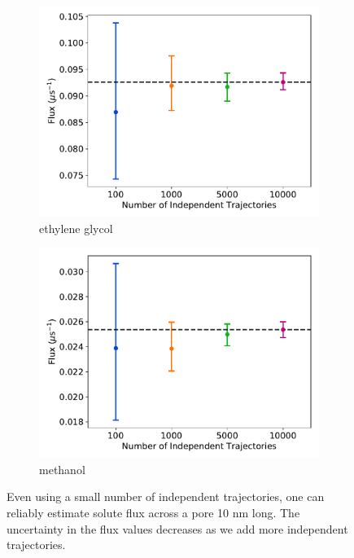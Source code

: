 \documentclass{article}
\begin{document}
\begin{figure}
\begin{subfigure}{0.45\textwidth}
  \includegraphics[width=\textwidth]{flux_curves_Nsensitivity_GCL.pdf}
  \caption{ethylene glycol}\label{fig:Nsensitivity_GCL}
  \end{subfigure}
  \begin{subfigure}{0.45\textwidth}
  \includegraphics[width=\textwidth]{flux_curves_Nsensitivity_MET.pdf}
  \caption{methanol}\label{fig:Nsensitivity_MET}
  \end{subfigure}
  \caption{Even using a small number of independent trajectories, one can
  reliably estimate solute flux across a pore 10 nm long. The uncertainty in 
  the flux values decreases as we add more independent trajectories.
  }\label{fig:flux_curve_sensitivity}
  \end{figure}
  
\end{document}
